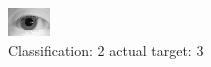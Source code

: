 \begin{figure}[h!]
\begin{center}
\includegraphics[width=0.60\columnwidth]{figures/ID1143_class_2_target_3.png}
\end{center}
\caption{ Classification: 2 actual target: 3}
\label{fig:ID1143_class_2_target_3}
\end{figure}
